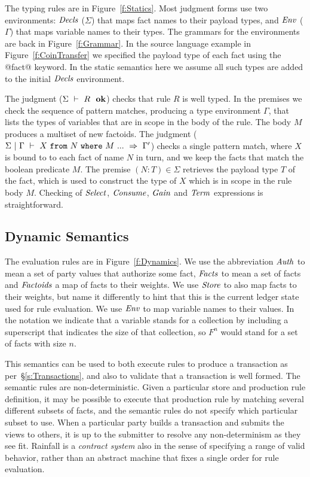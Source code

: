 The typing rules are in Figure~\ref{f:Statics}. Most judgment forms use two environments: $\mathit{Decls}$ ($\Sigma$) that maps fact names to their payload types, and $\mathit{Env}$ ($\Gamma$) that maps variable names to their types. The grammars for the environments are back in Figure~\ref{f:Grammar}. In the source language example in Figure~\ref{f:CoinTransfer} we specified the payload type of each fact using the @fact@ keyword. In the static semantics here we assume all such types are added to the initial $\mathit{Decls}$ environment.

The judgment ($\Sigma ~\vdash~ R~~ \textbf{ok}$) checks that rule $R$ is well typed. In the premises we check the sequence of pattern matches, producing a type environment $\Gamma$, that lists the types of variables that are in scope in the body of the rule. The body $M$ produces a multiset of new factoids. The judgment ($\Sigma~|~\Gamma~\vdash~X~ \texttt{from}~ N~ \texttt{where}~ M~ ...~\Rightarrow~\Gamma'$) checks a single pattern match, where $X$ is bound to to each fact of name $N$ in turn, and we keep the facts that match the boolean predicate $M$. The premise $(N:T) \in \Sigma$ retrieves the payload type $T$ of the fact, which is used to construct the type of $X$ which is in scope in the rule body $M$. Checking of $\mathit{Select}$, $\mathit{Consume}$, $\mathit{Gain}$ and $\mathit{Term}$ expressions is straightforward.





\subsection{Dynamic Semantics}
The evaluation rules are in Figure~\ref{f:Dynamics}. We use the abbreviation $\mathit{Auth}$ to mean a set of party values that authorize some fact, $\mathit{Facts}$ to mean a set of facts and $\mathit{Factoids}$ a map of facts to their weights. We use $\mathit{Store}$ to also map facts to their weights, but name it differently to hint that this is the current ledger state used for rule evaluation. We use $\mathit{Env}$ to map variable names to their values. In the notation we indicate that a variable stands for a collection by including a superscript that indicates the size of that collection, so $F^n$ would stand for a set of facts with size $n$.

This semantics can be used to both execute rules to produce a transaction as per~\S\ref{s:Transactions}, and also to validate that a transaction is well formed. The semantic rules are non-deterministic. Given a particular store and production rule definition, it may be possible to execute that production rule by matching several different subsets of facts, and the semantic rules do not specify which particular subset to use. When a particular party builds a transaction and submits the views to others, it is up to the submitter to resolve any  non-determinism as they see fit. Rainfall is a \emph{contract system} also in the sense of specifying a range of valid behavior, rather than an abstract machine that fixes a single order for rule evaluation.

